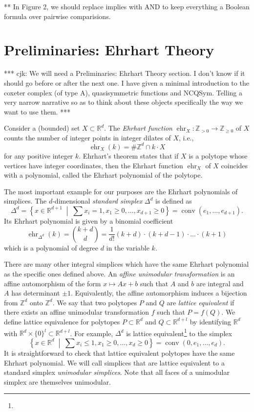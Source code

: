 \documentclass[12pt]{amsart}
\newcommand{\rar}{\rightarrow}
\newcommand{\RR}{\mathbb{R}}
\newcommand{\ZZ}{\mathbb{Z}}
\newcommand{\ehr}{\operatorname{ehr}}
\newcommand{\conv}{\operatorname{conv}}
\newcommand{\mset}[2]{ \left\{ #1 \; \middle| \; #2 \right\}}
\begin{document}
** In Figure 2, we should replace implies with AND to keep everything a Boolean formula over pairwise comparisions. 

\section{Preliminaries: Ehrhart Theory}

*** cjk: We will need a Preliminaries: Ehrhart Theory section.  I don't know if it should go before or after the next one.
I have given a minimal introduction to the coxeter complex (of type A), quasisymmetric functions and NCQSym.  Telling a very narrow narrative so as to think about these objects specifically the way we want to use them. ***

Consider a (bounded) set $X\subset \RR^d$. The \emph{Ehrhart function} $\ehr_X:\ZZ_{> 0}\rar\ZZ_{\geq 0}$ of $X$ counts the number of integer points in integer dilates of $X$, i.e., \[
  \ehr_X(k) = \#\ZZ^d \cap k\cdot X
\]
for any positive integer $k$. Ehrhart's theorem states that if $X$ is a polytope whose vertices have integer coordinates, then the Ehrhart function $\ehr_X$ of $X$ coincides with a polynomial, called the Ehrhart polynomial of the polytope.

The most important example for our purposes are the Ehrhart polynomials of simplices. The $d$-dimensional \emph{standard simplex} $\Delta^d$ is defined as
\[
  \Delta^d = \mset{x\in\RR^{d+1}}{\sum x_i =1, x_1 \geq 0, \ldots, x_{d+1} \geq 0} = \conv(e_1,\ldots,e_{d+1}).
\]
Its Ehrhart polynomial is given by a binomial coefficient
\[
  \ehr_{\Delta^d}(k) = \binom{k+d}{d} = \frac{1}{d!} (k+d)\cdot (k+d-1) \cdot \ldots \cdot (k+1)
\]
which is a polynomial of degree $d$ in the variable $k$.

There are many other integral simplices which have the same Ehrhart polynomial as the specific ones defined above. An \emph{affine unimodular transformation} is an affine automorphism of the form $x \mapsto Ax + b$ such that $A$ and $b$ are integral and $A$ has determinant $\pm1$. Equivalently, the affine automorphism induces a bijection from $\ZZ^d$ onto $\ZZ^d$. We say that two polytopes $P$ and $Q$ are \emph{lattice equivalent} if there exists an affine unimodular transformation $f$ such that $P=f(Q)$. We define lattice equivalence for polytopes $P\subset \RR^d$ and $Q\subset \RR^{d+l}$ by identifying $\RR^d$ with $\RR^d\times\{0\}^l\subset \RR^{d+l}$. For example, $\Delta^d$ is lattice equivalent\footnote{} to the simplex
\[
  \mset{x\in\RR^{d}}{\sum x_i \leq 1, x_1 \geq 0, \ldots, x_{d} \geq 0} = \conv(0,e_1,\ldots,e_d).
\]  It is straightforward to check that lattice equivalent polytopes have the same Ehrhart polynomial. We will call simplices that are lattice equivalent to a standard simplex \emph{unimodular simplices}. Note that all faces of a unimodular simplex are themselves unimodular.
\end{document}

